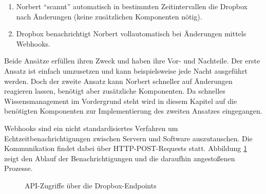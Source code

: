 \begin{enumerate}
	\item Norbert \enquote{scannt} automatisch in bestimmten Zeitintervallen die Dropbox nach Änderungen (keine zusätzlichen Komponenten nötig).
	
	\item Dropbox benachrichtigt Norbert vollautomatisch bei Änderungen mittels Webhooks.
\end{enumerate}

Beide Ansätze erfüllen ihren Zweck und haben ihre Vor- und Nachteile. Der erste Ansatz ist einfach umzusetzen und kann beispielsweise jede Nacht ausgeführt werden. Doch der zweite Ansatz kann Norbert schneller auf Änderungen reagieren lassen, benötigt aber zusätzliche Komponenten. Da schnelles Wissensmanagement im Vordergrund steht wird in diesem Kapitel auf die benötigten Komponenten zur Implementierung des zweiten Ansatzes eingegangen.

Webhooks sind ein nicht standardisiertes Verfahren um Echtzeitbenachrichtigungen zwischen Servern und Software auszutauschen. Die Kommunikation findet dabei über HTTP-POST-Requests statt. Abbildung \ref{04ergebnis:webhook} zeigt den Ablauf der Benachrichtigungen und die daraufhin angestoßenen Prozesse.

\begin{figure}[H]
\centering
	\scalebox{0.5}{}
	\caption{API-Zugriffe über die Dropbox-Endpoints}
	\label{04ergebnis:webhook}	
\end{figure}